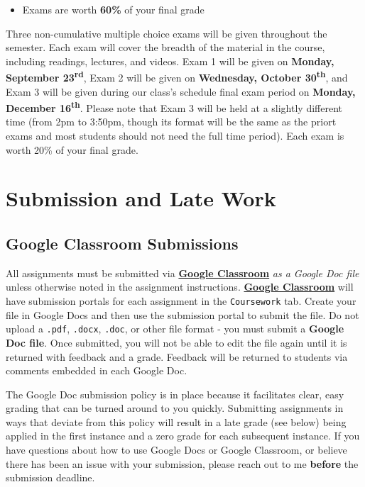 \documentclass[]{book}
\newenvironment{rmdblock}[1]
  {\begin{shaded*}
  \begin{itemize}
  \renewcommand{\labelitemi}{
    \raisebox{-.7\height}[0pt][0pt]{
      {\setkeys{Gin}{width=3em,keepaspectratio}\texttt{[image: images/\#1]}}
    }
  }
  \item
  }
  {
  \end{itemize}
  \end{shaded*}
  }
\newenvironment{rmdtip}
  {\begin{rmdblock}{tip}}
  {\end{rmdblock}}
\begin{document}
\begin{rmdtip}
Exams are worth \textbf{60\%} of your final grade
\end{rmdtip}

Three non-cumulative multiple choice exams will be given throughout the semester. Each exam will cover the breadth of the material in the course, including readings, lectures, and videos. Exam 1 will be given on \textbf{Monday, September 23\textsuperscript{rd}}, Exam 2 will be given on \textbf{Wednesday, October 30\textsuperscript{th}}, and Exam 3 will be given during our class's schedule final exam period on \textbf{Monday, December 16\textsuperscript{th}}. Please note that Exam 3 will be held at a slightly different time (from 2pm to 3:50pm, though its format will be the same as the priort exams and most students should not need the full time period). Each exam is worth 20\% of your final grade.

\hypertarget{submission-and-late-work}{%
\section{Submission and Late Work}\label{submission-and-late-work}}

\hypertarget{google-classroom-submissions}{%
\subsection{Google Classroom Submissions}\label{google-classroom-submissions}}

All assignments must be submitted via \textbf{\href{https://classroom.google.com}{Google Classroom}} \emph{as a Google Doc file} unless otherwise noted in the assignment instructions. \textbf{\href{https://classroom.google.com}{Google Classroom}} will have submission portals for each assignment in the \texttt{Coursework} tab. Create your file in Google Docs and then use the submission portal to submit the file. Do not upload a \texttt{.pdf}, \texttt{.docx}, \texttt{.doc}, or other file format - you must submit a \textbf{Google Doc file}. Once submitted, you will not be able to edit the file again until it is returned with feedback and a grade. Feedback will be returned to students via comments embedded in each Google Doc.

The Google Doc submission policy is in place because it facilitates clear, easy grading that can be turned around to you quickly. Submitting assignments in ways that deviate from this policy will result in a late grade (see below) being applied in the first instance and a zero grade for each subsequent instance. If you have questions about how to use Google Docs or Google Classroom, or believe there has been an issue with your submission, please reach out to me \textbf{before} the submission deadline.
\end{document}
